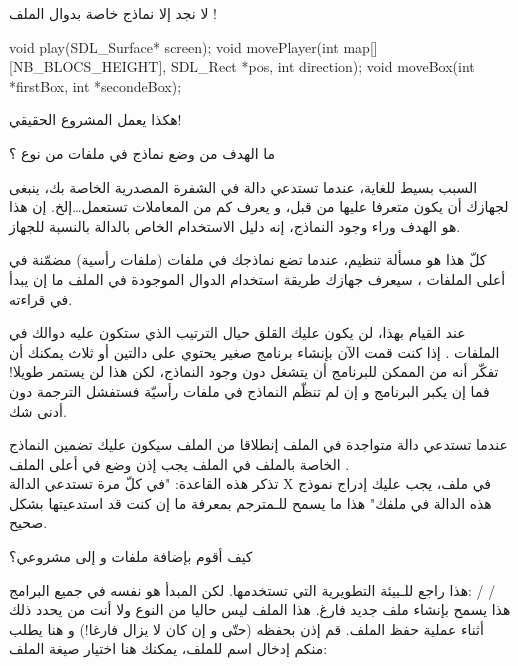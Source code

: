 لا نجد إلا نماذج خاصة بدوال الملف
!

\begin{Csource}
void play(SDL_Surface* screen);
void movePlayer(int map[][NB_BLOCS_HEIGHT], SDL_Rect *pos, int direction);
void moveBox(int *firstBox, int *secondeBox);
\end{Csource}

هكذا يعمل المشروع الحقيقي!

\begin{question}
  ما الهدف من وضع نماذج في ملفات من نوع
؟
\end{question}

السبب بسيط للغاية، عندما تستدعي دالة في الشفرة المصدرية الخاصة بك، ينبغى لجهازك أن يكون متعرفا عليها من قبل، و يعرف كم من المعاملات تستعمل\dots إلخ. إن هذا هو الهدف وراء وجود النماذج، إنه دليل الاستخدام الخاص بالدالة بالنسبة للجهاز.

كلّ هذا هو مسألة تنظيم، عندما تضع نماذجك في ملفات
(ملفات رأسية) مضمّنة في أعلى الملفات
،
سيعرف جهازك طريقة استخدام الدوال الموجودة في الملف ما إن يبدأ في قراءته.

عند القيام بهذا، لن يكون عليك القلق حيال الترتيب الذي ستكون عليه دوالك في الملفات
.
إذا كنت قمت الآن بإنشاء برنامج صغير يحتوي على دالتين أو ثلاث يمكنك أن تفكّر أنه من الممكن للبرنامج أن يتشغل دون وجود النماذج، لكن هذا لن يستمر طويلا! فما إن يكبر البرنامج و إن لم تنظّم النماذج في ملفات رأسيّة فستفشل الترجمة دون أدنى شك.

\begin{information}
  عندما تستدعي دالة متواجدة في الملف
  إنطلاقا من الملف
  سيكون عليك تضمين النماذج الخاصة بالملف
  في الملف
  يجب إذن وضع
  في أعلى الملف
  .\\
  تذكر هذه القاعدة: "في كلّ مرة تستدعي الدالة
  \textenglish{X}
  في ملف، يجب عليك إدراج نموذج هذه الدالة في ملفك" هذا ما يسمح للـمترجم بمعرفة ما إن كنت قد استدعيتها بشكل صحيح.
\end{information}

\begin{question}
  كيف أقوم بإضافة ملفات
 و
 إلى مشروعي؟
\end{question}

هذا راجع للـبيئة التطويرية التي تستخدمها. لكن المبدأ هو نفسه في جميع البرامج:
 /  / \\
هذا يسمح بإنشاء ملف جديد فارغ. هذا الملف ليس حاليا من النوع
ولا
أنت من يحدد ذلك أثناء عملية حفظ الملف. قم إذن بحفظه (حتّى و إن كان لا يزال فارغا!) و هنا يطلب منكم إدخال اسم للملف، يمكنك هنا اختيار صيغة الملف:

